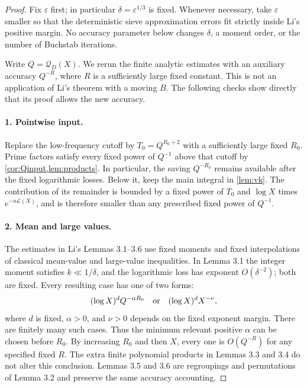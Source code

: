 \documentclass[11pt,a4paper]{article}
\theoremstyle{remark}
\newcommand{\Q}{\mathcal Q}
\newcommand{\LL}{\mathcal L}
\newcommand{\eps}{\varepsilon}
\begin{document}
\begin{proof}
Fix $\eps$ first; in particular $\delta=\eps^{1/3}$ is fixed.
Whenever necessary, take $\eps$ smaller so that the deterministic
sieve approximation errors fit strictly inside Li's positive margin.
No accuracy parameter below changes $\delta$, a moment order, or the
number of Buchstab iterations.

Write $Q=\Q_D(X)$.
We rerun the finite analytic estimates with an auxiliary accuracy
$Q^{-R}$, where $R$ is a sufficiently large fixed constant.
This is not an application of Li's theorem with a moving $B$.
The following checks show directly that its proof allows the new
accuracy.

\paragraph{1. Pointwise input.}
Replace the low-frequency cutoff by $T_0=Q^{R_0+2}$ with a sufficiently
large fixed $R_0$. Prime factors satisfy every fixed power of $Q^{-1}$
above that cutoff by \cref{cor:Qinput,lem:products}.
In particular, the saving $Q^{-R_0}$ remains available after the
fixed logarithmic losses.
Below it, keep the main integral in \cref{lem:vk}.
The contribution of its remainder is bounded by a fixed power of
$T_0$ and $\log X$ times $e^{-a\LL(X)}$, and is therefore smaller than
any prescribed fixed power of $Q^{-1}$.

\paragraph{2. Mean and large values.}
The estimates in Li's Lemmas 3.1--3.6 use fixed moments and fixed
interpolations of classical mean-value and large-value inequalities.
In Lemma 3.1 the integer moment satisfies $k\ll1/\delta$, and the
logarithmic loss has exponent $O(\delta^{-2})$; both are fixed.
Every resulting case has one of two forms:
\[
     (\log X)^d Q^{-\alpha R_0}
             \quad\hbox{or}\quad
     (\log X)^d X^{-\nu},
\]
where $d$ is fixed, $\alpha>0$, and $\nu>0$ depends on the fixed
exponent margin. There are finitely many such cases.
Thus the minimum relevant positive $\alpha$ can be chosen before
$R_0$. By increasing $R_0$ and then $X$, every one is
$O(Q^{-R})$ for any specified fixed $R$.
The extra finite polynomial products in Lemmas 3.3 and 3.4 do not
alter this conclusion. Lemmas 3.5 and 3.6 are regroupings and
permutations of Lemma 3.2 and preserve the same accuracy accounting.


\end{proof}
\end{document}

